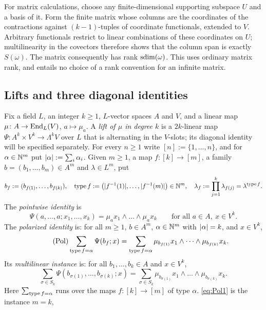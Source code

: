 For matrix calculations, choose any finite-dimensional supporting
subspace $U$ and a basis of it. Form the finite matrix whose columns
are the coordinates of the contractions against $(k-1)$\nobreakdash-tuples
of coordinate functionals, extended to $V$. Arbitrary functionals
restrict to linear combinations of these coordinates on $U$;
multilinearity in the covectors therefore shows that the column span
is exactly $S(\omega)$. The matrix consequently has rank
$\operatorname{sdim}(\omega)$. This uses ordinary matrix rank, and entails no
choice of a rank convention for an infinite matrix.

\subsection{Lifts and three diagonal identities}\label{ssec:diag}
Fix a field $L$, an integer $k\ge1$, $L$\nobreakdash-vector spaces $A$ and $V$, and a linear map $\mu\colon A\to\operatorname{End}_L(V)$,
$a\mapsto \mu_a$. A \emph{lift of $\mu$ in degree $k$} is a $2k$\nobreakdash-linear map $\Psi\colon A^k\times V^k\to\Lambda^kV$ over $L$ that is
alternating in the $V$\nobreakdash-slots; its diagonal identity will be specified separately. For every $n\ge1$ write
$[n]:=\{1,\dots,n\}$, and for $\alpha\in\mathbb N^m$ put $\lvert \alpha\rvert:=\sum_i\alpha_i$. Given $m\ge1$, a map
$f\colon[k]\to[m]$, a family $b=(b_1,\dots,b_m)\in A^m$ and $\lambda\in L^m$, put
\[
b_f:=(b_{f(1)},\dots,b_{f(k)}),\quad \operatorname{type} f:=\bigl(\lvert f^{-1}(1)\rvert,\dots,\lvert f^{-1}(m)\rvert\bigr)\in\mathbb N^m,\quad
\lambda_f:=\prod_{j=1}^k\lambda_{f(j)}=\lambda^{\operatorname{type} f}.
\]
The \emph{pointwise identity} is
\begin{equation*}\tag{Pw}\label{eq:Pw}
\Psi(a,\dots,a;x_1,\dots,x_k)=\mu_ax_1\wedge\dots\wedge \mu_ax_k\qquad\text{for all }a\in A,\ x\in V^k.
\end{equation*}
The \emph{polarized identity} is: for all $m\ge1$, $b\in A^m$, $\alpha\in\mathbb N^m$ with $\lvert \alpha\rvert=k$, and $x\in V^k$,
\begin{equation*}\tag{Pol}\label{eq:Pol}
\sum_{\operatorname{type} f=\alpha}\Psi(b_f;x)=\sum_{\operatorname{type} f=\alpha}\mu_{b_{f(1)}}x_1\wedge\dots\wedge \mu_{b_{f(k)}}x_k .
\end{equation*}
Its \emph{multilinear instance} is: for all $b_1,\dots,b_k\in A$ and $x\in V^k$,
\begin{equation*}\tag{Pol1}\label{eq:Pol1}
\sum_{\sigma\in S_k}\Psi(b_{\sigma(1)},\dots,b_{\sigma(k)};x)
=\sum_{\sigma\in S_k}\mu_{b_{\sigma(1)}}x_1\wedge\dots\wedge \mu_{b_{\sigma(k)}}x_k .
\end{equation*}
Here $\sum_{\operatorname{type} f=\alpha}$ runs over the maps $f\colon[k]\to[m]$ of type $\alpha$. \eqref{eq:Pol1} is the instance $m=k$,
